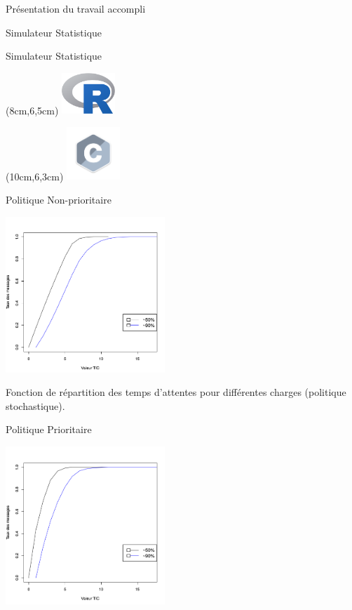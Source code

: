 \documentclass[10 pt]{beamer}
\begin{document}
\begin{section}{Pr\'esentation du travail accompli}
\begin{subsection}{Simulateur Statistique}
\begin{frame}{Simulateur Statistique}
 \begin{textblock*}{5cm}(8cm,6,5cm) %
\includegraphics [width=20mm]{logos/logor.png} 
\end{textblock*}

 \begin{textblock*}{5cm}(10cm,6,3cm) %
  \includegraphics [width=20mm]{logos/logoc.png}
\end{textblock*}


\end{frame}



\begin{frame}{Politique Non-prioritaire}
\begin{center}
\includegraphics [width=60mm]{images/fonction_repartition_non_prioritaire.png}

Fonction de r\'epartition des temps d'attentes pour diff\'erentes charges (politique stochastique).
\end{center}
\end{frame}

\begin{frame}{Politique Prioritaire}
\begin{center}
\includegraphics [width=60mm]{images/fonction_repartition_prioritaire.png}


\end{center}
\end{frame}
\end{subsection}
\end{section}
\end{document}
